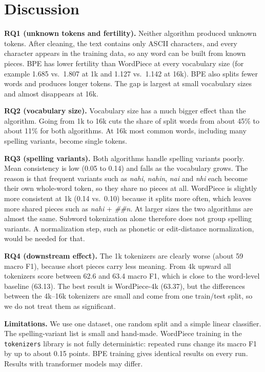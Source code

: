 \documentclass[11pt,a4paper]{article}
\begin{document}
\section{Discussion}
\textbf{RQ1 (unknown tokens and fertility).} Neither algorithm produced unknown tokens. After cleaning, the text contains only ASCII characters, and every character appears in the training data, so any word can be built from known pieces. BPE has lower fertility than WordPiece at every vocabulary size (for example 1.685 vs.\ 1.807 at 1k and 1.127 vs.\ 1.142 at 16k). BPE also splits fewer words and produces longer tokens. The gap is largest at small vocabulary sizes and almost disappears at 16k.

\textbf{RQ2 (vocabulary size).} Vocabulary size has a much bigger effect than the algorithm. Going from 1k to 16k cuts the share of split words from about 45\% to about 11\% for both algorithms. At 16k most common words, including many spelling variants, become single tokens.

\textbf{RQ3 (spelling variants).} Both algorithms handle spelling variants poorly. Mean consistency is low (0.05 to 0.14) and falls as the vocabulary grows. The reason is that frequent variants such as \textit{nahi}, \textit{nahin}, \textit{nai} and \textit{nhi} each become their own whole-word token, so they share no pieces at all. WordPiece is slightly more consistent at 1k (0.14 vs.\ 0.10) because it splits more often, which leaves more shared pieces such as \textit{nahi} + \textit{\#\#n}. At larger sizes the two algorithms are almost the same. Subword tokenization alone therefore does not group spelling variants. A normalization step, such as phonetic or edit-distance normalization, would be needed for that.

\textbf{RQ4 (downstream effect).} The 1k tokenizers are clearly worse (about 59 macro F1), because short pieces carry less meaning. From 4k upward all tokenizers score between 62.6 and 63.4 macro F1, which is close to the word-level baseline (63.13). The best result is WordPiece-4k (63.37), but the differences between the 4k--16k tokenizers are small and come from one train/test split, so we do not treat them as significant.

\textbf{Limitations.} We use one dataset, one random split and a simple linear classifier. The spelling-variant list is small and hand-made. WordPiece training in the \texttt{tokenizers} library is not fully deterministic: repeated runs change its macro F1 by up to about 0.15 points. BPE training gives identical results on every run. Results with transformer models may differ.
\end{document}
